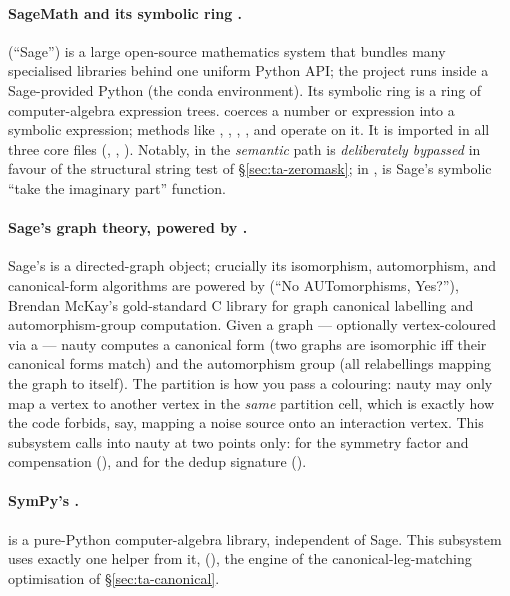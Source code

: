 \paragraph{SageMath and its symbolic ring .}  (``Sage'')
is a large open-source mathematics system that bundles many specialised libraries
behind one uniform Python API; the project runs inside a Sage-provided Python
(the  conda environment). Its symbolic ring  is a
ring of computer-algebra expression trees.  coerces a number or
expression into a symbolic expression; methods like ,
, , , and
 operate on it. It is imported in all three core
files (, ,
). Notably, in  the
\emph{semantic}  path is \emph{deliberately bypassed} in
favour of the structural string test of \S\ref{sec:ta-zeromask}; in
,  is Sage's symbolic ``take the
imaginary part'' function.

\paragraph{Sage's graph theory, powered by .} Sage's 
is a directed-graph object; crucially its isomorphism, automorphism, and
canonical-form algorithms are powered by  (``No AUTomorphisms,
Yes?''), Brendan McKay's gold-standard C library for graph canonical labelling
and automorphism-group computation. Given a graph --- optionally vertex-coloured
via a  --- nauty computes a canonical form (two graphs are
isomorphic iff their canonical forms match) and the automorphism group (all
relabellings mapping the graph to itself). The partition is how you pass a
colouring: nauty may only map a vertex to another vertex in the \emph{same}
partition cell, which is exactly how the code forbids, say, mapping a noise source
onto an interaction vertex. This subsystem calls into nauty at two points only:
 for the symmetry factor and
compensation (), and
 for the dedup signature
().

\paragraph{SymPy's .}  is a pure-Python
computer-algebra library, independent of Sage. This subsystem uses exactly one
helper from it,  (),
the engine of the canonical-leg-matching optimisation of \S\ref{sec:ta-canonical}.

